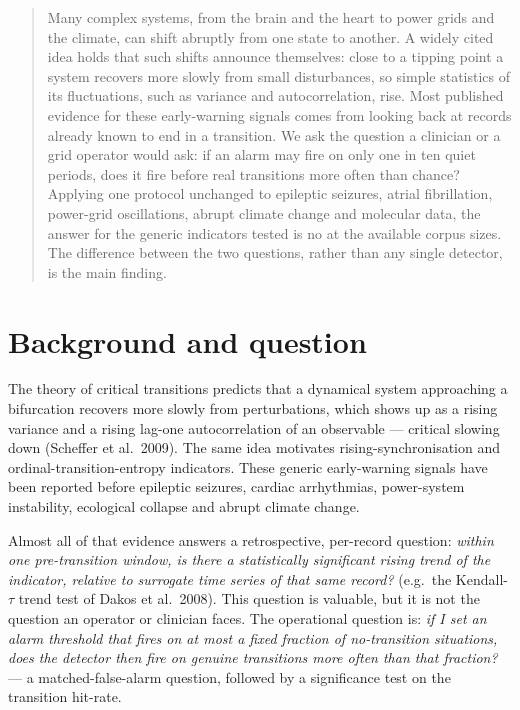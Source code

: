 \documentclass[aip,cha,preprint,amsmath,amssymb]{revtex4-2}
\begin{document}
\begin{quotation}
Many complex systems, from the brain and the heart to power grids and
the climate, can shift abruptly from one state to another. A widely
cited idea holds that such shifts announce themselves: close to a
tipping point a system recovers more slowly from small disturbances, so
simple statistics of its fluctuations, such as variance and
autocorrelation, rise. Most published evidence for these early-warning
signals comes from looking back at records already known to end in a
transition. We ask the question a clinician or a grid operator would
ask: if an alarm may fire on only one in ten quiet periods, does it
fire before real transitions more often than chance? Applying one
protocol unchanged to epileptic seizures, atrial fibrillation,
power-grid oscillations, abrupt climate change and molecular data, the
answer for the generic indicators tested is no at the available corpus
sizes. The difference between the two questions, rather than any single
detector, is the main finding.
\end{quotation}

\section{Background and question}\label{sec:background}

The theory of critical transitions predicts that a dynamical system
approaching a bifurcation recovers more slowly from perturbations, which
shows up as a rising variance and a rising lag-one autocorrelation of an
observable --- critical slowing down (Scheffer et al.\ 2009). The same
idea motivates rising-synchronisation and ordinal-transition-entropy
indicators. These generic early-warning signals have been reported
before epileptic seizures, cardiac arrhythmias, power-system
instability, ecological collapse and abrupt climate change.

Almost all of that evidence answers a retrospective, per-record
question: \emph{within one pre-transition window, is there a
statistically significant rising trend of the indicator, relative to
surrogate time series of that same record?} (e.g.\ the Kendall-$\tau$
trend test of Dakos et al.\ 2008). This question is valuable, but it is
not the question an operator or clinician faces. The operational
question is: \emph{if I set an alarm threshold that fires on at most a
fixed fraction of no-transition situations, does the detector then fire
on genuine transitions more often than that fraction?} --- a
matched-false-alarm question, followed by a significance test on the
transition hit-rate.
\end{document}
